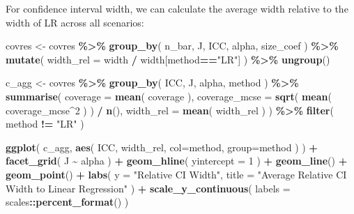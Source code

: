 \documentclass[
]{book}
\newenvironment{Shaded}{\begin{snugshade}}{\end{snugshade}}
\newcommand{\AttributeTok}[1]{\textcolor[rgb]{0.13,0.29,0.53}{#1}}
\newcommand{\DecValTok}[1]{\textcolor[rgb]{0.00,0.00,0.81}{#1}}
\newcommand{\FunctionTok}[1]{\textcolor[rgb]{0.13,0.29,0.53}{\textbf{#1}}}
\newcommand{\NormalTok}[1]{#1}
\newcommand{\OtherTok}[1]{\textcolor[rgb]{0.56,0.35,0.01}{#1}}
\newcommand{\SpecialCharTok}[1]{\textcolor[rgb]{0.81,0.36,0.00}{\textbf{#1}}}
\newcommand{\StringTok}[1]{\textcolor[rgb]{0.31,0.60,0.02}{#1}}
\begin{document}
For confidence interval width, we can calculate the average width relative to the width of LR across all scenarios:

\begin{Shaded}
\begin{Highlighting}[]
\NormalTok{covres }\OtherTok{\textless{}{-}}\NormalTok{ covres }\SpecialCharTok{\%\textgreater{}\%}
  \FunctionTok{group\_by}\NormalTok{( n\_bar, J, ICC, alpha, size\_coef ) }\SpecialCharTok{\%\textgreater{}\%}
  \FunctionTok{mutate}\NormalTok{( }\AttributeTok{width\_rel =}\NormalTok{ width }\SpecialCharTok{/}\NormalTok{ width[method}\SpecialCharTok{==}\StringTok{"LR"}\NormalTok{] ) }\SpecialCharTok{\%\textgreater{}\%}
  \FunctionTok{ungroup}\NormalTok{()}

\NormalTok{c\_agg }\OtherTok{\textless{}{-}}\NormalTok{ covres }\SpecialCharTok{\%\textgreater{}\%}
  \FunctionTok{group\_by}\NormalTok{( ICC, J, alpha, method ) }\SpecialCharTok{\%\textgreater{}\%}
  \FunctionTok{summarise}\NormalTok{( }\AttributeTok{coverage =} \FunctionTok{mean}\NormalTok{( coverage ),}
             \AttributeTok{coverage\_mcse =} \FunctionTok{sqrt}\NormalTok{( }\FunctionTok{mean}\NormalTok{( coverage\_mcse}\SpecialCharTok{\^{}}\DecValTok{2}\NormalTok{ ) ) }\SpecialCharTok{/} \FunctionTok{n}\NormalTok{(),}
             \AttributeTok{width\_rel =} \FunctionTok{mean}\NormalTok{( width\_rel ) ) }\SpecialCharTok{\%\textgreater{}\%}
  \FunctionTok{filter}\NormalTok{( method }\SpecialCharTok{!=} \StringTok{"LR"}\NormalTok{ )}
  
\FunctionTok{ggplot}\NormalTok{( c\_agg, }\FunctionTok{aes}\NormalTok{( ICC, width\_rel, }\AttributeTok{col=}\NormalTok{method, }\AttributeTok{group=}\NormalTok{method ) ) }\SpecialCharTok{+}
  \FunctionTok{facet\_grid}\NormalTok{( J }\SpecialCharTok{\textasciitilde{}}\NormalTok{ alpha ) }\SpecialCharTok{+}
  \FunctionTok{geom\_hline}\NormalTok{( }\AttributeTok{yintercept =} \DecValTok{1}\NormalTok{ ) }\SpecialCharTok{+}
  \FunctionTok{geom\_line}\NormalTok{() }\SpecialCharTok{+} \FunctionTok{geom\_point}\NormalTok{() }\SpecialCharTok{+}
  \FunctionTok{labs}\NormalTok{( }\AttributeTok{y =} \StringTok{"Relative CI Width"}\NormalTok{,}
        \AttributeTok{title =} \StringTok{"Average Relative CI Width to Linear Regression"}\NormalTok{ ) }\SpecialCharTok{+}
  \FunctionTok{scale\_y\_continuous}\NormalTok{( }\AttributeTok{labels =}\NormalTok{ scales}\SpecialCharTok{::}\FunctionTok{percent\_format}\NormalTok{() )}
\end{Highlighting}
\end{Shaded}
\end{document}
